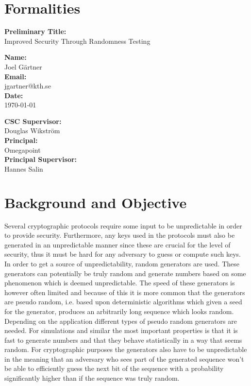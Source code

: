 \documentclass[a4paper,11pt]{report}
\begin{document}
\section*{Formalities}
\begin{center}
\textbf{Preliminary Title:}\\ Improved Security Through Randomness Testing
\end{center}

\begin{minipage}[t]{7cm}
\textbf{Name:}\\ Joel Gärtner\\
\textbf{Email:}\\ jgartner@kth.se\\
\textbf{Date:}\\ \today
\end{minipage}
\begin{minipage}[t]{7cm}
\textbf{CSC Supervisor:}\\ Douglas Wikström \\
\textbf{Principal:}\\
Omegapoint \\
\textbf{Principal Supervisor:}\\
 Hannes Salin\\
\end{minipage}
\section*{Background and Objective}
Several cryptographic protocols require some input to be unpredictable 
in order to provide security. Furthermore, any keys used in the protocols 
must also be generated in an unpredictable manner since these are crucial for the 
level of security, thus it must be hard for any adversary to guess or compute such 
keys. In order to get a source of unpredictability, random generators are used.
These generators can potentially 
be truly random and generate numbers based on some phenomenon which is deemed 
unpredictable. The speed of these generators is however often limited and because
of this it is more common that the generators are pseudo random, i.e.
based upon deterministic algorithms which given a seed for the generator,
produces an arbitrarily long sequence which looks random.
Depending on the application different types of pseudo random generators
are needed. For simulations and similar the most important properties 
is that it is fast to generate numbers and that they behave statistically
in a way that seems random. For cryptographic purposes the generators 
also have to be unpredictable in the meaning that an adversary who sees part
of the generated sequence won't be able to efficiently guess the next bit 
of the sequence with a probability significantly higher than if the sequence 
was truly random. \\
\end{document}
